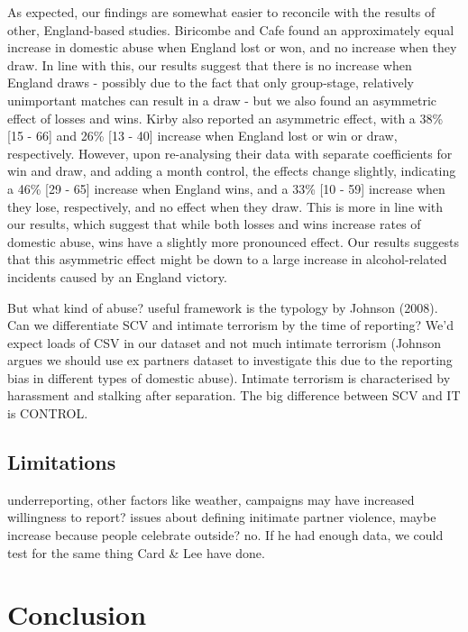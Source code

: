 \documentclass[12pt, letterpaper]{article}
\begin{document}
As expected, our findings are somewhat easier to reconcile with the results of other, England-based studies. Biricombe and Cafe found an approximately equal increase in domestic abuse when England lost or won, and no increase when they draw. In line with this, our results suggest that there is no increase when England draws - possibly due to the fact that only group-stage, relatively unimportant matches can result in a draw - but we also found an asymmetric effect of losses and wins. Kirby also reported an asymmetric effect, with a 38\% [15 - 66] and 26\% [13 - 40] increase when England lost or win or draw, respectively. However, upon re-analysing their data with separate coefficients for win and draw, and adding a month control, the effects change slightly, indicating a 46\% [29 - 65] increase when England wins, and a 33\% [10 - 59] increase when they lose, respectively, and no effect when they draw. This is more in line with our results, which suggest that while both losses and wins increase rates of domestic abuse, wins have a slightly more pronounced effect. Our results suggests that this asymmetric effect might be down to a large increase in alcohol-related incidents caused by an England victory.


But what kind of abuse? useful framework is the typology by Johnson (2008). Can we differentiate SCV and intimate terrorism by the time of reporting? We'd expect loads of CSV in our dataset and not much intimate terrorism (Johnson argues we should use ex partners dataset to investigate this due to the reporting bias in different types of domestic abuse). Intimate terrorism is characterised by harassment and stalking after separation. The big difference between SCV and IT is CONTROL. 




\subsection{Limitations}
underreporting, other factors like weather, campaigns may have increased willingness to report? issues about defining initimate partner violence, maybe increase because people celebrate outside? no.
If he had enough data, we could test for the same thing Card \& Lee have done.


\section{Conclusion}
\end{document}
